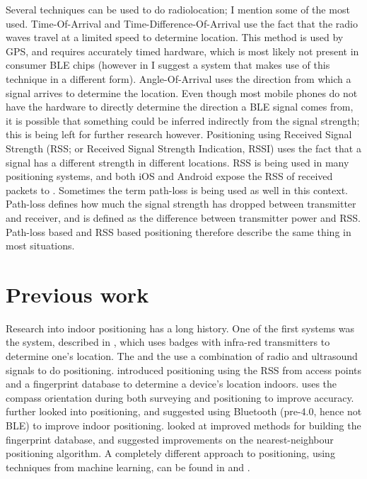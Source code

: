 Several techniques can be used to do radiolocation; I mention some of the most used.
Time-Of-Arrival and Time-Difference-Of-Arrival use the fact that the radio waves travel at a limited speed to determine location.
This method is used by GPS, and requires accurately timed hardware, which is most likely not present in consumer BLE chips (however in  I suggest a system that makes use of this technique in a different form).
Angle-Of-Arrival uses the direction from which a signal arrives to determine the location.
Even though most mobile phones do not have the hardware to directly determine the direction a BLE signal comes from, it is possible that something could be inferred indirectly from the signal strength; this is being left for further research however.
Positioning using Received Signal Strength (RSS; or Received Signal Strength Indication, RSSI) uses the fact that a signal has a different strength in different locations.
RSS is being used in many \wifi positioning systems, and both iOS and Android expose the RSS of received packets to \apps.
Sometimes the term path-loss is being used as well in this context.
Path-loss defines how much the signal strength has dropped between transmitter and receiver, and is defined as the difference between transmitter power and RSS.
Path-loss based and RSS based positioning therefore describe the same thing in most situations.

\section{Previous work}
Research into indoor positioning has a long history.
One of the first systems was the  system, described in \citet{want1992active}, which uses badges with infra-red transmitters to determine one's location.
The  \citep{harter2002anatomy} and the  \citep{priyantha2000cricket} use a combination of radio and ultrasound signals to do positioning.
\citet{bahl2000radar} introduced \wifi positioning using the RSS from \wifi access points and a fingerprint database to determine a device's location indoors.
\citet{king2006compass} uses the compass orientation during both surveying and positioning to improve accuracy.
\citet{castro2001probabilistic} further looked into \wifi positioning, and \citet{pandya2003indoor} suggested using Bluetooth (pre-4.0, hence not BLE) to improve indoor positioning.
\citet{li2005method} looked at improved methods for building the fingerprint database, and \citet{shin2012enhanced} suggested improvements on the nearest-neighbour positioning algorithm.
A completely different approach to positioning, using techniques from machine learning, can be found in \citet{battiti2002location} and \citep{ferris2007wifi}.


